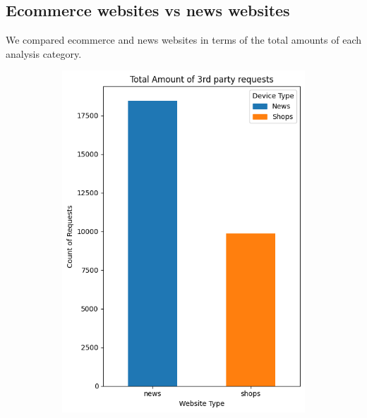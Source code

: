 \subsection{Ecommerce websites vs news websites}
We compared ecommerce and news websites in terms of the total amounts of each analysis category. 

\begin{figure}[h!]
    \centering
    
    \begin{subfigure}[b]{0.28\textwidth}
        \includegraphics[width=\textwidth]{./assets/comparison1.png}
        \caption{}
        \label{fig:3rdparty}
    \end{subfigure}
    \hfill
    \begin{subfigure}[b]{0.28\textwidth}

\end{subfigure}
\end{figure}
